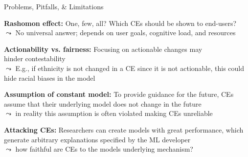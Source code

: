 \documentclass[10pt,compress,t,notes=noshow,xcolor=table]{beamer}
\begin{document}
\begin{framei}[align=top]{Problems, Pitfalls, \& Limitations}
\item<+-> \textbf{Rashomon effect:} One, few, all? Which CEs should be shown to end-users?\\
$\leadsto$ No universal answer; depends on user goals, cognitive load, and resources
\item<+-> \textbf{Actionability vs. fairness:} Focusing on actionable changes may\\
hinder contestability\\
$\leadsto$ E.g., if ethnicity is not changed in a CE since it is not actionable, this could hide racial biases in the model
\item<+-> \textbf{Assumption of constant model:} To provide guidance for the future, CEs assume that their underlying model does not change in the future\\
$\leadsto$ in reality this assumption is often violated making CEs unreliable
\item<+-> \textbf{Attacking CEs:} Researchers can create models with great performance, which generate arbitrary explanations specified by the ML developer\\
$\leadsto$ how faithful are CEs to the models underlying mechanism?

\end{framei}
\end{document}
